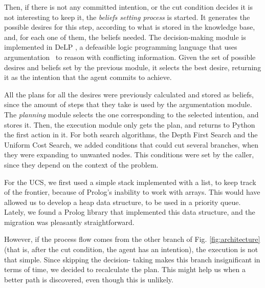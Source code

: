     Then, if there is not any committed intention, or the cut condition decides
    it is not interesting to keep it, the \textit{beliefs setting process} is
    started. It generates the possible desires for this step, according to what
    is stored in the knowledge base, and, for each one of them, the beliefs
    needed.  The decision-making module is implemented in
    DeLP \cite{Rotstein:2007} \cite{Ferretti:2008}, a defeasible logic
    programming language that uses argumentation \cite{DBLP:conf/comma/2008}\ to
    reason with conflicting information.  Given the set of possible desires and
    beliefs set by the previous module, it selects the best desire, returning it
    as the intention that the agent commits to achieve.

    All the plans for all the desires were previously calculated and stored as 
    beliefs, since the amount of steps that they take is used by the 
    argumentation module. The \textit{planning} module selects the one 
    corresponding to the selected intention, and stores it. Then, the 
    execution module only gets the plan, and returns to Python the first 
    action in it.
    For both search algorithms, the Depth First Search and the Uniform Cost 
    Search, we added conditions that could cut several branches, when they were 
    expanding to unwanted nodes. This conditions were set by the caller, since 
    they depend on the context of the problem.

    For the UCS, we first used a simple stack implemented with a list, to keep 
    track of the frontier, because of Prolog's inability to work with arrays. This 
    would have allowed us to develop a heap data structure, to be used in a 
    priority queue. Lately, we found a Prolog library that implemented this data 
    structure, and the migration was pleasantly straightforward.

    However, if the process flow comes from the other branch of Fig. 
    \ref{fig:architecture} (that is, after the cut condition, the agent has an 
    intention), the execution is not that simple. Since skipping the decision-
    taking makes this branch insignificant in terms of time, we decided to 
    recalculate the plan. This might help us when a better path is discovered, 
    even though this is unlikely.

